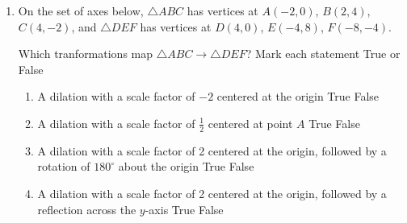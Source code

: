 \documentclass[12pt, twoside]{article}
\begin{document}
\begin{enumerate}
  \item On the set of axes below, $\triangle ABC$ has vertices at $A(-2,0)$, $B(2,4)$, $C(4,-2)$, and $\triangle DEF$ has vertices at $D(4,0)$, $E(-4,8)$, $F(-8,-4)$.
  \begin{center}
  \end{center}
  Which tranformations map $\triangle ABC \rightarrow \triangle DEF$? Mark each statement True or False
    \begin{enumerate}
      \item A dilation with a scale factor of $-2$ centered at the origin \hfill True \quad False
      \item A dilation with a scale factor of $\frac{1}{2}$ centered at point $A$ \hfill True \quad False
      \item A dilation with a scale factor of 2 centered at the origin, followed by a rotation of $180^\circ$ about the origin \hfill True \quad False
      \item A dilation with a scale factor of 2 centered at the origin, followed by a reflection across the $y$-axis \hfill True \quad False
    \end{enumerate}


\end{enumerate}
\end{document}
